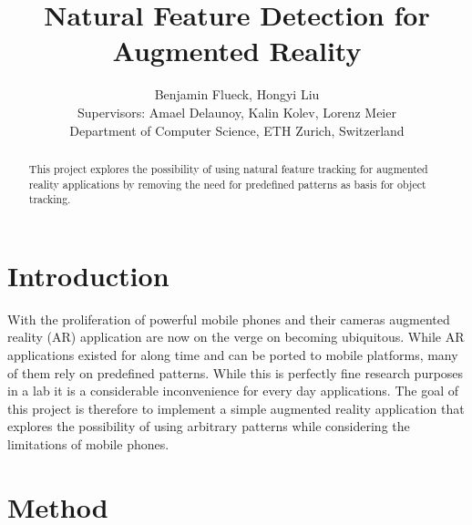 \documentclass[10pt,conference,compsocconf]{IEEEtran}
\begin{document}
\title{Natural Feature Detection for Augmented Reality}

\author{
  Benjamin Flueck, Hongyi Liu\\
  Supervisors: Amael Delaunoy, Kalin Kolev, Lorenz Meier\\
  Department of Computer Science, ETH Zurich, Switzerland\\
}

\maketitle

\begin{abstract}
This project explores the possibility of using natural feature tracking for augmented reality applications by removing the need for predefined patterns as basis for object tracking.
\end{abstract}

\section{Introduction}

With the proliferation of powerful mobile phones and their cameras augmented reality (AR) application are now on the verge on becoming ubiquitous. While AR applications existed for along time and can be ported to mobile platforms, many of them rely on predefined patterns. While this is perfectly fine research purposes in a lab it is a considerable inconvenience for every day applications. The goal of this project is therefore to implement a simple augmented reality application that explores the possibility of using arbitrary patterns while considering the limitations of mobile phones.

\section{Method}
\end{document}
